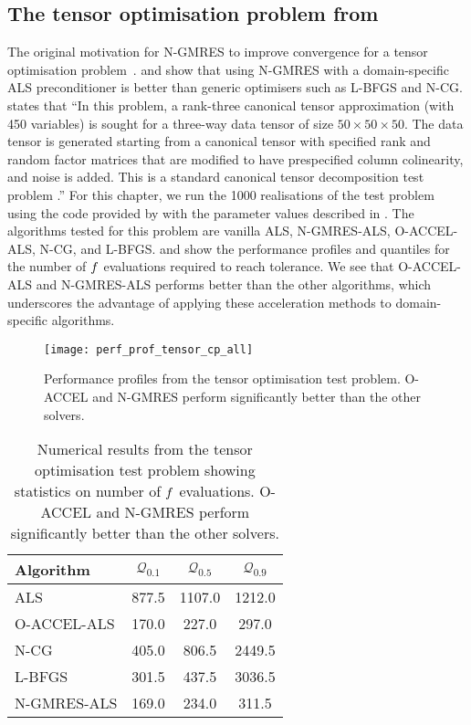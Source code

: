 \documentclass[main.tex]{subfiles}
\begin{document}
\subsection{The tensor optimisation problem from \citeauthor{sterck2013steepest}}\label{subsec:tensor_optim}
The original motivation for N-GMRES to improve convergence for a
tensor optimisation problem~\cite{sterck2012nonlinear}.
\citet{sterck2012nonlinear} and \citet{sterck2013steepest} show that
using N-GMRES with a domain-specific ALS preconditioner is better than
generic optimisers such as L-BFGS and N-CG.
\citet{sterck2013steepest} states that ``In this problem, a rank-three
canonical tensor approximation (with 450 variables) is sought for a
three-way data tensor of size $50\times 50\times 50$. The data tensor
is generated starting from a canonical tensor with specified rank and
random factor matrices that are modified to have prespecified column
colinearity, and noise is added. This is a standard canonical tensor
decomposition test problem \citep{acar2011scalable}.''  For this
chapter, we run the \num{1000} realisations of the test problem
using the code provided by \citet{sterck2013steepest} with the
parameter values described in .  The
algorithms tested for this problem are vanilla ALS, N-GMRES-ALS,
O-ACCEL-ALS, N-CG, and L-BFGS.   and
 show the performance profiles and
quantiles for the number of $f$ evaluations required to reach
tolerance.  We see that O-ACCEL-ALS and N-GMRES-ALS performs better
than the other algorithms, which underscores the advantage of applying
these acceleration methods to domain-specific algorithms.
\begin{figure}[htbp]
  \centering
  \texttt{[image: perf\_prof\_tensor\_cp\_all]}
  \caption{Performance profiles from the tensor optimisation test
    problem. O-ACCEL and N-GMRES perform significantly better than the
    other solvers.}\label{fig:perf_prof_tensor_cp_all}
\end{figure}

\begin{table}[hbtp]
  \centering
  \begin{tabular}{lS[table-auto-round,table-format=4]
    S[table-auto-round,table-format=4]
    S[table-auto-round,table-format=4]}
    \toprule
    Algorithm&{$\mathcal{Q}_{0.1}$}&{$\mathcal{Q}_{0.5}$}&{$\mathcal{Q}_{0.9}$}\\
    \midrule
    ALS&877.5&1107.0&1212.0\\
    O-ACCEL-ALS&170.0&227.0&297.0\\
    N-CG&405.0&806.5&2449.5\\
    L-BFGS&301.5&437.5&3036.5\\
    N-GMRES-ALS&169.0&234.0&311.5\\
    \bottomrule
  \end{tabular}
  \caption{Numerical results from the tensor optimisation test
    problem showing statistics on number of $f$ evaluations. O-ACCEL and N-GMRES perform significantly better than the
    other solvers.}\label{tbl:quantiles_tensor_cp_all}
\end{table}
\end{document}

